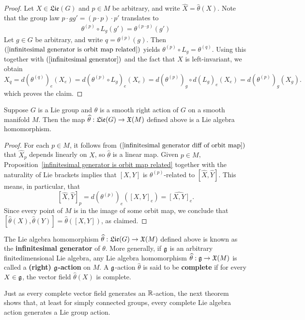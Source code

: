 \begin{proof}
Let $X\in\mathfrak{Lie}(G)$ and $p\in M$ be arbitrary, and write $\widehat{X}=\widehat{\theta}(X)$. Note that the group law $p\cdot gg'=(p\cdot p)\cdot p'$ translates to
\begin{align}\label{infinitesimal generator is orbit map related-1}
\theta^{(p)}\circ L_g(g')=\theta^{(p\cdot g)}(g')
\end{align}
Let $g\in G$ be arbitrary, and write $q=\theta^{(p)}(g)$. Then $(\ref{infinitesimal generator is orbit map related})$ yields $\theta^{(p)}\circ L_g=\theta^{(q)}$. Using this together with $(\ref{infinitesimal generator})$ and the fact that $X$ is left-invariant, we obtain
\[X_q=d(\theta^{(q)})_e(X_e)=d(\theta^{(p)}\circ L_g)_e(X_e)=d(\theta^{(p)})_g\circ d(L_g)_e(X_e)=d(\theta^{(p)})_g(X_g).\]
which proves the claim.
\end{proof}
\begin{proposition}
Suppose $G$ is a Lie group and $\theta$ is a smooth right action of $G$ on a smooth manifold $M$. Then the map $\widehat{\theta}:\mathfrak{Lie}(G)\to\mathfrak{X}(M)$ defined above is a Lie algebra homomorphism.
\end{proposition}
\begin{proof}
For each $p\in M$, it follows from $(\ref{infinitesimal generator diff of orbit map})$ that $\widehat{X}_p$ depends linearly on $X$, so $\widehat{\theta}$ is a linear map. Given $p\in M$, Proposition~\ref{infinitesimal generator is orbit map related} together with the naturality of Lie brackets implies that $[X,Y]$ is $\theta^{(p)}$-related to $[\widehat{X},\widehat{Y}]$. This means, in particular, that
\[[\widehat{X},\widehat{Y}]_p=d(\theta^{(p)})_e([X,Y]_e)=\widehat{[X,Y]}_e.\]
Since every point of $M$ is in the image of some orbit map, we conclude that $[\widehat{\theta}(X),\widehat{\theta}(Y)]=\widehat{\theta}([X,Y])$, as claimed.
\end{proof}
The Lie algebra homomorphism $\widehat{\theta}:\mathfrak{Lie}(G)\to\mathfrak{X}(M)$ defined above is known as the \textbf{infinitesimal generator} of $\theta$. More generally, if $\mathfrak{g}$ is an arbitrary finitedimensional Lie algebra, any Lie algebra homomorphism $\widehat{\theta}:\mathfrak{g}\to\mathfrak{X}(M)$ is called a \textbf{(right) $\mathfrak{g}$-action} on $M$. A $\mathfrak{g}$-action $\widehat{\theta}$ is said to be \textbf{complete} if for every $X\in\mathfrak{g}$, the
vector field $\widehat{\theta}(X)$ is complete.\par
Just as every complete vector field generates an $\mathbb{R}$-action, the next theorem shows that, at least for simply connected groups, every complete Lie algebra action generates a Lie group action.
